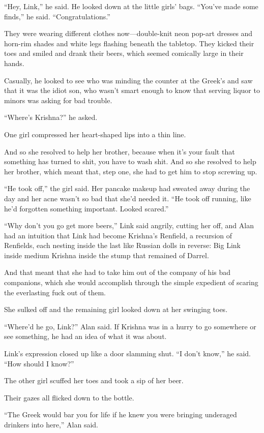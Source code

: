 \documentclass{article}
\begin{document}
``Hey, Link,'' he said.  He looked down at the little girls' bags. 
``You've made some finds,'' he said.  ``Congratulations.''

They were wearing different clothes now---double-knit neon pop-art
dresses and horn-rim shades and white legs flashing beneath the
tabletop.  They kicked their toes and smiled and drank their beers,
which seemed comically large in their hands.

Casually, he looked to see who was minding the counter at the Greek's
and saw that it was the idiot son, who wasn't smart enough to know
that serving liquor to minors was asking for bad trouble.

``Where's Krishna?'' he asked.

One girl compressed her heart-shaped lips into a thin line.

And so she resolved to help her brother, because when it's your fault
that something has turned to shit, you have to wash shit.  And so she
resolved to help her brother, which meant that, step one, she had to
get him to stop screwing up.

``He took off,'' the girl said.  Her pancake makeup had sweated away
during the day and her acne wasn't so bad that she'd needed it.  ``He
took off running, like he'd forgotten something important.  Looked
scared.''

``Why don't you go get more beers,'' Link said angrily, cutting her
off, and Alan had an intuition that Link had become Krishna's
Renfield, a recursion of Renfields, each nesting inside the last like
Russian dolls in reverse:  Big Link inside medium Krishna inside the
stump that remained of Darrel.

And that meant that she had to take him out of the company of his bad
companions, which she would accomplish through the simple expedient of
scaring the everlasting fuck out of them.

She sulked off and the remaining girl looked down at her swinging
toes.

``Where'd he go, Link?'' Alan said.  If Krishna was in a hurry to go
somewhere or see something, he had an idea of what it was about.

Link's expression closed up like a door slamming shut.  ``I don't
know,'' he said.  ``How should I know?''

The other girl scuffed her toes and took a sip of her beer.

Their gazes all flicked down to the bottle.

``The Greek would bar you for life if he knew you were bringing
underaged drinkers into here,'' Alan said.
\end{document}
